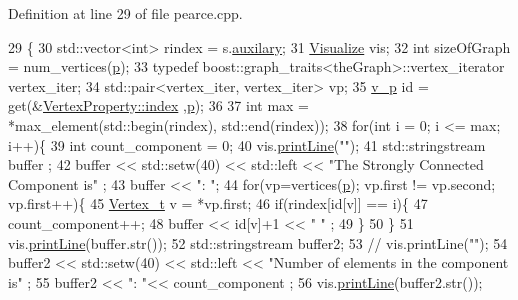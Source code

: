 Definition at line 29 of file pearce.\+cpp.


\begin{DoxyCode}
29                                                           \{
30     std::vector<int> rindex = s.\hyperlink{struct_utility_structs_1_1_storage_items_afb9d346eaacb1c5e7f60f559c45910f2}{auxilary};
31     \hyperlink{class_visualize}{Visualize} vis;
32     \textcolor{keywordtype}{int} sizeOfGraph = num\_vertices(\hyperlink{class_pearce_a2320928312fd97f6bcb1f16684f79a03}{p});
33     \textcolor{keyword}{typedef} boost::graph\_traits<theGraph>::vertex\_iterator vertex\_iter;
34     std::pair<vertex\_iter, vertex\_iter> vp;
35     \hyperlink{utilities_8h_a3f4959b3d837fa6351a9414c79280286}{v\_p} \textcolor{keywordtype}{id} = \textcolor{keyword}{get}(&\hyperlink{struct_utility_structs_1_1_vertex_property_a636cb729438e999aa3d9a17ac39d8641}{VertexProperty::index} ,\hyperlink{class_pearce_a2320928312fd97f6bcb1f16684f79a03}{p});
36     
37     \textcolor{keywordtype}{int} max = *max\_element(std::begin(rindex), std::end(rindex));
38     \textcolor{keywordflow}{for}(\textcolor{keywordtype}{int} i = 0; i <= max; i++)\{
39          \textcolor{keywordtype}{int} count\_component = 0;
40           vis.\hyperlink{class_visualize_abce6cd538dc0715b21851e0bf0377d85}{printLine}(\textcolor{stringliteral}{""});
41             std::stringstream buffer ;
42             buffer << std::setw(40) << std::left << \textcolor{stringliteral}{"The Strongly Connected Component is"} ;
43             buffer << \textcolor{stringliteral}{": "};
44           \textcolor{keywordflow}{for}(vp=vertices(\hyperlink{class_pearce_a2320928312fd97f6bcb1f16684f79a03}{p}); vp.first != vp.second; vp.first++)\{
45                  \hyperlink{utilities_8h_a344cd987714d06997f0becda3c96d6e2}{Vertex\_t} v = *vp.first;
46                 \textcolor{keywordflow}{if}(rindex[\textcolor{keywordtype}{id}[v]] == i)\{
47                     count\_component++;
48                     buffer << \textcolor{keywordtype}{id}[v]+1 <<  \textcolor{stringliteral}{" "} ;
49                 \}
50          \}
51         vis.\hyperlink{class_visualize_abce6cd538dc0715b21851e0bf0377d85}{printLine}(buffer.str());
52             std::stringstream buffer2;
53            \textcolor{comment}{// vis.printLine("");}
54             buffer2 << std::setw(40) << std::left << \textcolor{stringliteral}{"Number of elements in the component is"} ;
55             buffer2 << \textcolor{stringliteral}{": "}<< count\_component ;
56             vis.\hyperlink{class_visualize_abce6cd538dc0715b21851e0bf0377d85}{printLine}(buffer2.str());

\end{DoxyCode}
